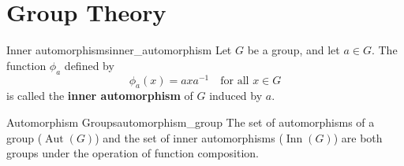 \documentclass{article}
\begin{document}
\section{Group Theory}

\begin{definition}{Inner automorphisms}{inner_automorphism}
Let \(G\) be a group, and let \(a \in G\). The function \(\phi_{a}\) defined by
\[
\phi_{a}(x) = a x a^{-1} \quad \text{for all } x \in G
\]
is called the \textbf{inner automorphism} of \(G\) induced by \(a\).
\end{definition}

\begin{theorem}{Automorphism Groups}{automorphism_group}
The set of automorphisms of a group (\(\operatorname{Aut}(G)\)) and the set of inner automorphisms (\(\operatorname{Inn}(G)\)) are both groups under the operation of function composition.
\end{theorem}
\end{document}
